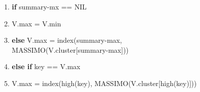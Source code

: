 \documentclass{article}
\begin{document}
\begin{flushleft}
\begin{enumerate}
                \item \hspace{60pt} \textbf{if} summary-mx == NIL
                \item \hspace{80pt} V.max = V.min
                \item \hspace{60pt} \textbf{else} V.max = index(summary-max,\\ 
                      \hspace{110pt} MASSIMO(V.cluster[summary-max]))
                \item \hspace{20pt} \textbf{else if} key == V.max
                \item \hspace{40pt} V.max = index(high(key), MASSIMO(V.cluster[high(key)]))
            \end{enumerate}
            
            
            
\end{flushleft}
\end{document}
